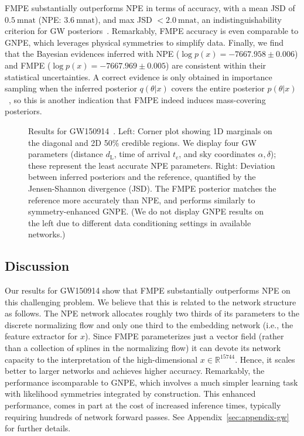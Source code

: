 \documentclass{article}
\theoremstyle{remark}
\begin{document}
FMPE substantially outperforms NPE in terms of accuracy, with a mean JSD of $0.5~\text{mnat}$ (NPE: $3.6~\text{mnat}$), and max JSD $<2.0~\text{mnat}$, an indistinguishability criterion for GW posteriors~\cite{Romero-Shaw:2020owr}. Remarkably, FMPE accuracy is even comparable to GNPE, which leverages physical symmetries to simplify data. Finally, we find that the Bayesian evidences inferred with NPE ($\log p(x) = -7667.958\pm 0.006$) and FMPE ($\log p(x) = -7667.969\pm 0.005$) are consistent within their statistical uncertainties. A correct evidence is only obtained in importance sampling when the inferred posterior $q(\theta|x)$ covers the entire posterior $p(\theta|x)$~\cite{Dax:2022pxd}, so this is another indication that FMPE indeed induces mass-covering posteriors.

\begin{figure}
  \centering
  \begin{minipage}{\textwidth}
    \hfill
      \end{minipage}
  \caption{\label{fig:GW150914}
  Results for GW150914~\cite{Abbott:2016blz}. Left: Corner plot showing 1D marginals on the diagonal and 2D 50\% credible regions. We display four GW parameters (distance $d_\text{L}$, time of arrival $t_\text{c}$, and sky coordinates $\alpha,\delta$); these represent the least accurate NPE parameters. Right: Deviation between inferred posteriors and the reference, quantified by the Jensen-Shannon divergence (JSD). The FMPE posterior matches the reference more accurately than NPE, and performs similarly to symmetry-enhanced GNPE. (We do not display GNPE results on the left due to different data conditioning settings in available networks.)
  }
\end{figure}


\subsection{Discussion}

Our results for GW150914 show that FMPE substantially outperforms NPE on this challenging problem. We believe that this is related to the network structure as follows. The NPE network allocates roughly two thirds of its parameters to the discrete normalizing flow and only one third to the embedding network (i.e., the feature extractor for $x$). Since FMPE parameterizes just a vector field (rather than a collection of splines in the normalizing flow) it can devote its network capacity to the interpretation of the high-dimensional $x \in \mathbb{R}^{15744}$. Hence, it scales better to larger networks and achieves higher accuracy. Remarkably, the performance iscomparable to GNPE, which involves a much simpler learning task with likelihood symmetries integrated by construction. This enhanced performance, comes in part at the cost of increased inference times, typically requiring hundreds of network forward passes. See Appendix~\ref{sec:appendix-gw} for further details. 
\end{document}
